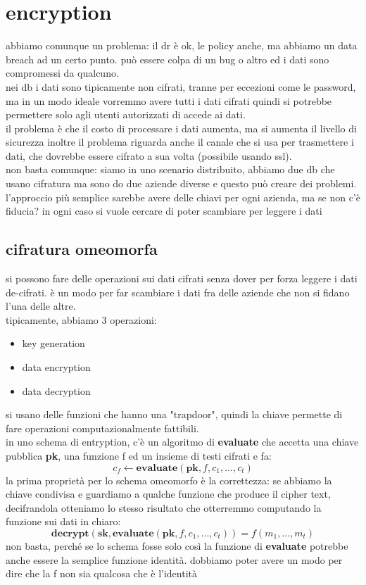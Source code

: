 \documentclass[12pt, oneside]{extbook} %
\begin{document}
\section{encryption}
abbiamo comunque un problema: il dr è ok, le policy anche, ma abbiamo un data breach ad un certo punto. può essere colpa di un bug o altro ed i dati sono compromessi da qualcuno.\\nei db i dati sono tipicamente non cifrati, tranne per eccezioni come le password, ma in un modo ideale vorremmo avere tutti i dati cifrati quindi si potrebbe permettere solo agli utenti autorizzati di accede ai dati.\\il problema è che il costo di processare i dati aumenta, ma si aumenta il livello di sicurezza inoltre il problema riguarda anche il canale che si usa per trasmettere i dati, che dovrebbe essere cifrato a sua volta (possibile usando ssl).\\non basta comunque: siamo in uno scenario distribuito, abbiamo due db che usano cifratura ma sono do due aziende diverse e questo può creare dei problemi. l'approccio più semplice sarebbe avere delle chiavi per ogni azienda, ma se non c'è fiducia? in ogni caso si vuole cercare di poter scambiare per leggere i dati
\subsection{cifratura omeomorfa}
si possono fare delle operazioni sui dati cifrati senza dover per forza leggere i dati de-cifrati. è un modo per far scambiare i dati fra delle aziende che non si fidano l'una delle altre.\\tipicamente, abbiamo 3 operazioni:
\begin{itemize}
	\item key generation
	\item data encryption
	\item data decryption
\end{itemize}
si usano delle funzioni che hanno una "trapdoor", quindi la chiave permette di fare operazioni computazionalmente fattibili.\\in uno schema di entryption, c'è un algoritmo di \textbf{evaluate} che accetta una chiave pubblica \textbf{pk}, una funzione f ed un insieme di testi cifrati e fa:
\begin{equation}
	c_f \leftarrow \textbf{evaluate}(\textbf{pk}, f, c_1, ..., c_t)
\end{equation}
la prima proprietà per lo schema omeomorfo è la correttezza: se abbiamo la chiave condivisa e guardiamo a qualche funzione che produce il cipher text, decifrandola otteniamo lo stesso risultato che otterremmo computando la funzione sui dati in chiaro:
\begin{equation}
	\textbf{decrypt}(\textbf{sk}, \textbf{evaluate}(\textbf{pk}, f, c_1, ..., c_t)) = f(m_1, ..., m_t)
\end{equation}
non basta, perché se lo schema fosse solo così la funzione di \textbf{evaluate} potrebbe anche essere la semplice funzione identità. dobbiamo poter avere un modo per dire che la f non sia qualcosa che è l'identità
\end{document}
